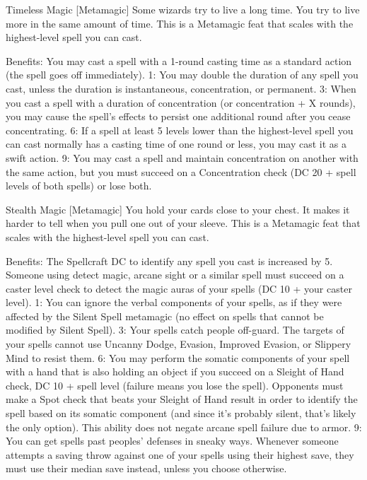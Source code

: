 Timeless Magic [Metamagic]
Some wizards try to live a long time. You try to live more in the same amount of time.
This is a Metamagic feat that scales with the highest-level spell you can cast.

Benefits: You may cast a spell with a 1-round casting time as a standard action (the spell goes off immediately).
1: You may double the duration of any spell you cast, unless the duration is instantaneous, concentration, or permanent.
3: When you cast a spell with a duration of concentration (or concentration + X rounds), you may cause the spell's effects to persist one additional round after you cease concentrating.
6: If a spell at least 5 levels lower than the highest-level spell you can cast normally has a casting time of one round or less, you may cast it as a swift action.
9: You may cast a spell and maintain concentration on another with the same action, but you must succeed on a Concentration check (DC 20 + spell levels of both spells) or lose both.


Stealth Magic [Metamagic]
You hold your cards close to your chest. It makes it harder to tell when you pull one out of your sleeve.
This is a Metamagic feat that scales with the highest-level spell you can cast.

Benefits: The Spellcraft DC to identify any spell you cast is increased by 5. Someone using detect magic, arcane sight or a similar spell must succeed on a caster level check to detect the magic auras of your spells (DC 10 + your caster level).
1: You can ignore the verbal components of your spells, as if they were affected by the Silent Spell metamagic (no effect on spells that cannot be modified by Silent Spell).
3: Your spells catch people off-guard. The targets of your spells cannot use Uncanny Dodge, Evasion, Improved Evasion, or Slippery Mind to resist them.
6: You may perform the somatic components of your spell with a hand that is also holding an object if you succeed on a Sleight of Hand check, DC 10 + spell level (failure means you lose the spell). Opponents must make a Spot check that beats your Sleight of Hand result in order to identify the spell based on its somatic component (and since it's probably silent, that's likely the only option). This ability does not negate arcane spell failure due to armor.
9: You can get spells past peoples' defenses in sneaky ways. Whenever someone attempts a saving throw against one of your spells using their highest save, they must use their median save instead, unless you choose otherwise.
